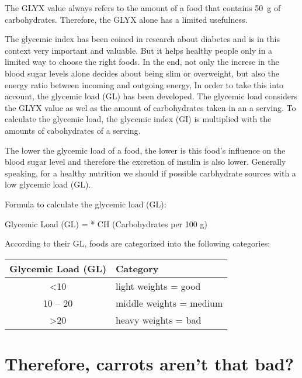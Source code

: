 \documentclass[../main.tex]{subfiles}
\begin{document}
The GLYX value always refers to the amount of a food that contains \SI{50}{\g} of carbohydrates.
Therefore, the GLYX alone has a limited usefulness.

The glycemic index has been coined in research about diabetes and is in this context very important and valuable.
But it helps healthy people only in a limited way   to choose the right foods.
In the end, not only the increse in the blood sugar levels alone decides about being slim or overweight,
but also the energy ratio between incoming and outgoing energy,
In order to take this into account, the glycemic load (GL) has been developed.
The glycemic load considers  the GLYX value as wel as the amount of carbohydrates taken in an a serving.
To calculate the glycemic load, the glycemic index (GI) is multiplied with the amounts of cabohydrates of a serving.

The lower the glycemic load of a food, the lower is this food's influence on the blood sugar level and
therefore the excretion of insulin is also lower.
Generally speaking, for a healthy nutrition we should if possible carbhydrate sources with a low glycemic load (GL).

Formula to calculate the glycemic load (GL):

\begin{center}
  Glycemic Load (GL) =  * CH (Carbohydrates per 100 g)
  \end{center}

According to their GL, foods are categorized into the following categories:

\begin{center}
  \begin{tabular}{cl}
    \textbf{Glycemic Load (GL)} & \textbf{Category} \\
    \hline
    \textless 10 & light weights = good \\
    10 -- 20 & middle weights = medium \\
    \textgreater 20 & heavy weights = bad \\
  \end{tabular}
\end{center}

\section{Therefore, carrots aren't that bad?}
\end{document}
